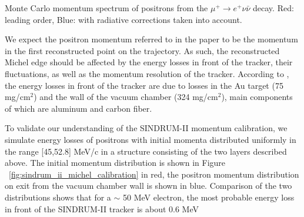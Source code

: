  {
  \label{fig:mu2e_5645_fig_001_mue3_decay}
  Monte Carlo momentum spectrum of positrons from the $\mu^+ \rightarrow e^+ \nu \bar{\nu}$
  decay. Red: leading order, Blue: with radiative corrections taken into account.
}
\vspace{0.1in}

We expect the positron momentum referred to in the paper
to be the momentum in the first reconstructed point on the trajectory. As such, the
reconstructed Michel edge should be affected by the energy losses in front of the
tracker, their fluctuations, as well as the momentum resolution of the tracker.
According to \cite{sindrum_ii:Bertl2006}, the energy losses in front of the tracker
are due to losses in the Au target (75 mg/cm$^2$) and the wall of the
vacuum chamber (324 mg/cm$^2$), main components of which are aluminum and carbon fiber.

To validate our understanding of the SINDRUM-II momentum calibration,
we simulate energy losses of positrons with initial momenta distributed uniformly
in the range [45,52.8] MeV/c in a structure consisting of the two layers described
above. The initial momentum distribution is shown
in Figure ~\ref{fig:sindrum_ii_michel_calibration} in red,
the positron momentum distribution on exit from the vacuum chamber wall is shown in blue.
Comparison of the two distributions shows that for a $\sim$ 50 MeV electron, the most probable
energy loss in front of the SINDRUM-II tracker is about 0.6 MeV

